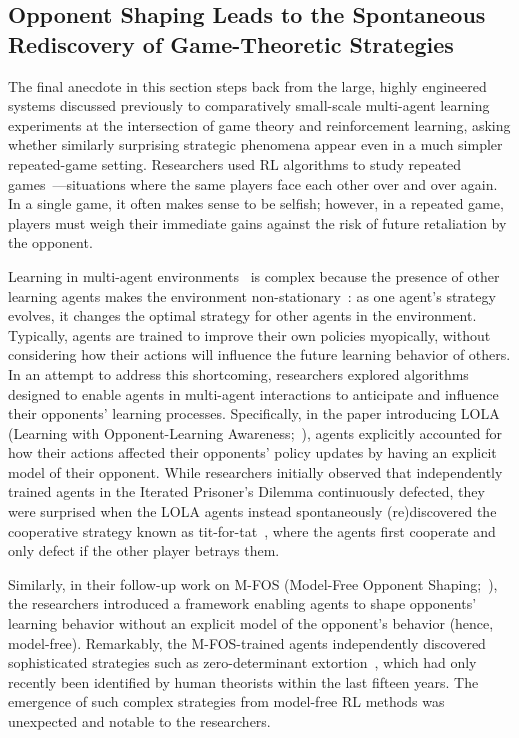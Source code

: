 \subsection{Opponent Shaping Leads to the Spontaneous Rediscovery of Game-Theoretic Strategies~\citep{lu2022modelfreeopponentshaping, foerster2018learningopponentlearningawareness}}
\label{sec:opponentshaping}

The final anecdote in this section steps back from the large, highly engineered systems discussed previously to comparatively small-scale multi-agent learning experiments at the intersection of game theory and reinforcement learning, asking whether similarly surprising strategic phenomena appear even in a much simpler repeated-game setting.
Researchers used RL algorithms to study repeated games~\citep{aumannrepeated59}---situations where the same players face each other over and over again.
In a single game, it often makes sense to be selfish; however, in a repeated game, players must weigh their immediate gains against the risk of future retaliation by the opponent.

Learning in multi-agent environments~\citep{lanctot2017unifiedgametheoreticapproachmultiagent} is complex because the presence of other learning agents makes the environment non-stationary~\citep{amato2025initialintroductioncooperativemultiagent}: as one agent's strategy evolves, it changes the optimal strategy for other agents in the environment. Typically, agents are trained to improve their own policies myopically, without considering how their actions will influence the future learning behavior of others.
In an attempt to address this shortcoming, researchers explored algorithms designed to enable agents in multi-agent interactions to anticipate and influence their opponents' learning processes. Specifically, in the paper introducing LOLA (Learning with Opponent-Learning Awareness;~\citealp{foerster2018learningopponentlearningawareness}), agents explicitly accounted for how their actions affected their opponents' policy updates by having an explicit model of their opponent.
While researchers initially observed that independently trained agents in the Iterated Prisoner's Dilemma continuously defected, they were surprised when the LOLA agents instead spontaneously (re)discovered the cooperative strategy known as tit-for-tat~\citep{Axelrod1981gametheory}, where the agents first cooperate and only defect if the other player betrays them.

Similarly, in their follow-up work on M-FOS (Model-Free Opponent Shaping;~\citealp{lu2022modelfreeopponentshaping}), the researchers introduced a framework enabling agents to shape opponents' learning behavior without an explicit model of the opponent's behavior (hence, model-free). Remarkably, the M-FOS-trained agents independently discovered sophisticated strategies such as zero-determinant extortion~\citep{Stewart2013zerodeterminant, Hao2015ZeroDet, Press2012Zerodeterminant}, which had only recently been identified by human theorists within the last fifteen years.
The emergence of such complex strategies from model-free RL methods was unexpected and notable to the researchers.

